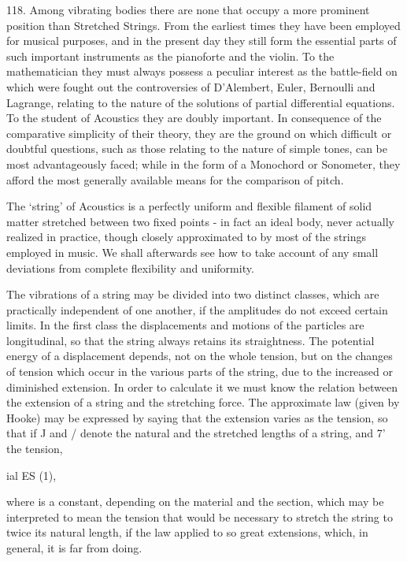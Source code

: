 118. Among vibrating bodies there are none that occupy a more prominent
position than Stretched Strings. From the earliest times they have been
employed for musical purposes, and in the present day they still form the
essential parts of such important instruments as the pianoforte and the violin.
To the mathematician they must always possess a peculiar interest as the
battle-field on which were fought out the controversies of D'Alembert, Euler,
Bernoulli and Lagrange, relating to the nature of the solutions of partial
differential equations. To the student of Acoustics they are doubly important.
In consequence of the comparative simplicity of their theory, they are the
ground on which difficult or doubtful questions, such as those relating to the
nature of simple tones, can be most advantageously faced; while in the form of
a Monochord or Sonometer, they afford the most generally available means for
the comparison of pitch.

The `string' of Acoustics is a perfectly uniform and flexible filament of solid
matter stretched between two fixed points - in fact an ideal body, never
actually realized in practice, though closely approximated to by most of the
strings employed in music. We shall afterwards see how to take account of any
small deviations from complete flexibility and uniformity.

The vibrations of a string may be divided into two distinct classes, which are
practically independent of one another, if the amplitudes do not exceed certain
limits. In the first class the displacements and motions of the particles are
longitudinal, so that the string always retains its straightness. The potential
energy of a displacement depends, not on the whole tension, but on the changes
of tension which occur in the various parts of the string, due to the increased
or diminished extension. In order to calculate it we must know the relation
between the extension of a string and the stretching force. The approximate law
(given by Hooke) may be expressed by saying that the extension varies as the
tension, so that if J and / denote the natural and the stretched lengths of a
string, and 7' the tension,

ial ES (1),

where is a constant, depending on the material and the section, which may be
interpreted to mean the tension that would be necessary to stretch the string
to twice its natural length, if the law applied to so great extensions, which,
in general, it is far from doing.

